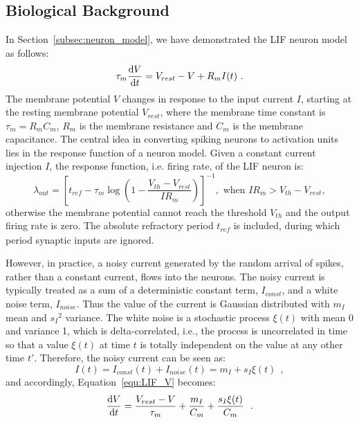 	
	
	\subsection{Biological Background}
	\label{sec:siergert}
	In Section~\ref{subsec:neuron_model}, we have demonstrated the  LIF neuron model as follows:
	\begin{equation}
	\tau_m \frac{\mathrm{d} V}{\mathrm{d} t}=V_{rest} - V + R_{m} I(t) ~.
	\label{equ:LIF_V}
	\end{equation}
	The membrane potential $V$ changes in response to the input current $I$, starting at the resting membrane potential $V_{rest}$, where the membrane time constant is $\tau_m = R_mC_m$, $R_m$ is the membrane resistance and $C_m$ is the membrane capacitance.
	The central idea in converting spiking neurons to activation units lies in the response function of a neuron model.
	Given a constant current injection $I$, the response function, i.e. firing rate, of the LIF neuron is:
	\begin{equation}
	\lambda_\mathit{out}=
	\left [ t_\mathit{ref}-\tau_m\log \left ( 1-\frac{V_{th}-V_\mathit{rest}}{IR_m}  \right )\right ]^{-1}, \textrm{~when~} IR_m>V_{th}-V_{rest},
	\label{equ:consI}
	\end{equation}
	otherwise the membrane potential cannot reach the threshold $V_{th}$ and the output firing rate is zero. 
	The absolute refractory period $t_\mathit{ref}$ is included, during which period synaptic inputs are ignored.

	However, in practice, a noisy current generated by the random arrival of spikes, rather than a constant current, flows into the neurons.
	The noisy current is typically treated as a sum of a deterministic constant term, $I_{const}$, and a white noise term, $I_{noise}$.
	Thus the value of the current is Gaussian distributed with $m_I$ mean and ${s_I}^2$ variance.
	The white noise is a stochastic process $\xi(t)$ with mean 0 and variance 1, which is delta-correlated, i.e., the process is uncorrelated in time so that a value $\xi(t)$ at time $t$ is totally independent on the value at any other time $t'$.
	Therefore, the noisy current can be seen as:
	\begin{equation}
	I(t) = I_{const}(t)+I_{noise}(t) = m_I + s_I\xi(t)~~,
	\label{equ:noisyI}
	\end{equation}
	and accordingly, Equation~\ref{equ:LIF_V} becomes:
	\begin{equation}
	\frac{\mathrm{d} V}{\mathrm{d} t}=\frac{V_{rest} - V}{\tau_m } + \frac{m_I}{C_m} + \frac{s_I\xi(t)}{C_m}~~.
	\label{equ:LIF_V2}
	\end{equation}

